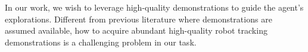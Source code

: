 In our work, we wish to leverage high-quality demonstrations to guide the agent's explorations. Different from previous literature where demonstrations are assumed available, how to acquire abundant high-quality robot tracking demonstrations is a challenging problem in our task. 





